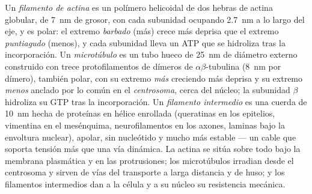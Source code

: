 \begin{definition}\label{def:b3:cytoskeleton-motility:filaments}
Un \emph{filamento de actina} es un polímero helicoidal de dos hebras de
actina globular, de \qty{7}{nm} de grosor, con cada subunidad ocupando
\qty{2.7}{nm} a lo largo del eje, y es polar: el extremo \emph{barbado}
(más) crece más deprisa que el extremo \emph{puntiagudo} (menos), y cada
subunidad lleva un ATP que se hidroliza tras la incorporación. Un
\emph{microtúbulo} es un tubo hueco de \qty{25}{nm} de diámetro externo
construido con trece protofilamentos de dímeros de
$\alpha\beta$-tubulina (\qty{8}{nm} por dímero), también polar, con su
extremo \emph{más} creciendo más deprisa y su extremo \emph{menos} anclado
por lo común en el \emph{centrosoma}, cerca del núcleo; la subunidad
$\beta$ hidroliza su GTP tras la incorporación. Un \emph{filamento
intermedio} es una cuerda de \qty{10}{nm} hecha de proteínas en hélice
enrollada (queratinas en los epitelios, vimentina en el mesénquima,
neurofilamentos en los axones, laminas bajo la envoltura nuclear),
apolar, sin nucleótido y mucho más estable --- un cable que soporta
tensión más que una vía dinámica. La actina se sitúa sobre todo bajo la
membrana plasmática y en las protrusiones; los microtúbulos irradian
desde el centrosoma y sirven de vías del transporte a larga distancia y
de huso; y los filamentos intermedios dan a la célula y a su núcleo su
resistencia mecánica.
\end{definition}

